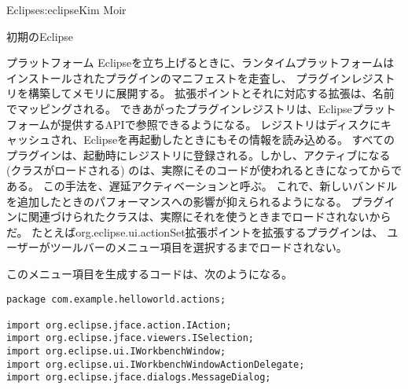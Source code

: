 \begin{aosachapter}{Eclipse}{s:eclipse}{Kim Moir}
\begin{aosasect1}{初期のEclipse}
\begin{aosasect2}{プラットフォーム}
Eclipseを立ち上げるときに、ランタイムプラットフォームはインストールされたプラグインのマニフェストを走査し、
プラグインレジストリを構築してメモリに展開する。
拡張ポイントとそれに対応する拡張は、名前でマッピングされる。
できあがったプラグインレジストリは、Eclipseプラットフォームが提供するAPIで参照できるようになる。
レジストリはディスクにキャッシュされ、Eclipseを再起動したときにもその情報を読み込める。
すべてのプラグインは、起動時にレジストリに登録される。しかし、アクティブになる(クラスがロードされる)
のは、実際にそのコードが使われるときになってからである。
この手法を、遅延アクティベーションと呼ぶ。
これで、新しいバンドルを追加したときのパフォーマンスへの影響が抑えられるようになる。
プラグインに関連づけられたクラスは、実際にそれを使うときまでロードされないからだ。
たとえばorg.eclipse.ui.actionSet拡張ポイントを拡張するプラグインは、
ユーザーがツールバーのメニュー項目を選択するまでロードされない。


このメニュー項目を生成するコードは、次のようになる。

\begin{verbatim}
package com.example.helloworld.actions;

import org.eclipse.jface.action.IAction;
import org.eclipse.jface.viewers.ISelection;
import org.eclipse.ui.IWorkbenchWindow;
import org.eclipse.ui.IWorkbenchWindowActionDelegate;
import org.eclipse.jface.dialogs.MessageDialog;


\end{verbatim}
\end{aosasect2}
\end{aosasect1}
\end{aosachapter}
